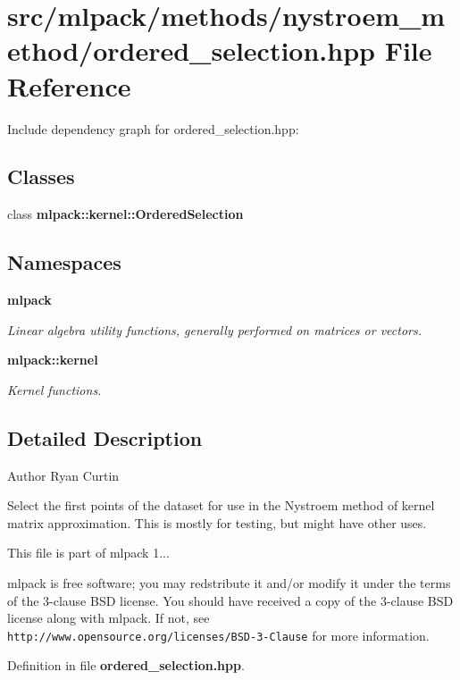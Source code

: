 \section{src/mlpack/methods/nystroem\-\_\-method/ordered\-\_\-selection.hpp File Reference}
\label{ordered__selection_8hpp}
Include dependency graph for ordered\-\_\-selection.\-hpp\-:
\subsection*{Classes}
\begin{DoxyCompactItemize}
\item 
class {\bf mlpack\-::kernel\-::\-Ordered\-Selection}
\end{DoxyCompactItemize}
\subsection*{Namespaces}
\begin{DoxyCompactItemize}
\item 
{\bf mlpack}
\begin{DoxyCompactList}\small\item\em Linear algebra utility functions, generally performed on matrices or vectors. \end{DoxyCompactList}\item 
{\bf mlpack\-::kernel}
\begin{DoxyCompactList}\small\item\em Kernel functions. \end{DoxyCompactList}\end{DoxyCompactItemize}


\subsection{Detailed Description}
\begin{DoxyAuthor}{Author}
Ryan Curtin
\end{DoxyAuthor}
Select the first points of the dataset for use in the Nystroem method of kernel matrix approximation. This is mostly for testing, but might have other uses.

This file is part of mlpack 1...

mlpack is free software; you may redstribute it and/or modify it under the terms of the 3-\/clause B\-S\-D license. You should have received a copy of the 3-\/clause B\-S\-D license along with mlpack. If not, see {\tt http\-://www.\-opensource.\-org/licenses/\-B\-S\-D-\/3-\/\-Clause} for more information. 

Definition in file {\bf ordered\-\_\-selection.\-hpp}.

